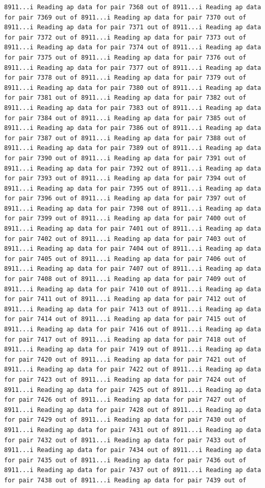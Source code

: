 \documentclass[
]{article}
\begin{document}
\begin{verbatim}
8911...i Reading ap data for pair 7368 out of 8911...i Reading ap data for pair 7369 out of 8911...i Reading ap data for pair 7370 out of 8911...i Reading ap data for pair 7371 out of 8911...i Reading ap data for pair 7372 out of 8911...i Reading ap data for pair 7373 out of 8911...i Reading ap data for pair 7374 out of 8911...i Reading ap data for pair 7375 out of 8911...i Reading ap data for pair 7376 out of 8911...i Reading ap data for pair 7377 out of 8911...i Reading ap data for pair 7378 out of 8911...i Reading ap data for pair 7379 out of 8911...i Reading ap data for pair 7380 out of 8911...i Reading ap data for pair 7381 out of 8911...i Reading ap data for pair 7382 out of 8911...i Reading ap data for pair 7383 out of 8911...i Reading ap data for pair 7384 out of 8911...i Reading ap data for pair 7385 out of 8911...i Reading ap data for pair 7386 out of 8911...i Reading ap data for pair 7387 out of 8911...i Reading ap data for pair 7388 out of 8911...i Reading ap data for pair 7389 out of 8911...i Reading ap data for pair 7390 out of 8911...i Reading ap data for pair 7391 out of 8911...i Reading ap data for pair 7392 out of 8911...i Reading ap data for pair 7393 out of 8911...i Reading ap data for pair 7394 out of 8911...i Reading ap data for pair 7395 out of 8911...i Reading ap data for pair 7396 out of 8911...i Reading ap data for pair 7397 out of 8911...i Reading ap data for pair 7398 out of 8911...i Reading ap data for pair 7399 out of 8911...i Reading ap data for pair 7400 out of 8911...i Reading ap data for pair 7401 out of 8911...i Reading ap data for pair 7402 out of 8911...i Reading ap data for pair 7403 out of 8911...i Reading ap data for pair 7404 out of 8911...i Reading ap data for pair 7405 out of 8911...i Reading ap data for pair 7406 out of 8911...i Reading ap data for pair 7407 out of 8911...i Reading ap data for pair 7408 out of 8911...i Reading ap data for pair 7409 out of 8911...i Reading ap data for pair 7410 out of 8911...i Reading ap data for pair 7411 out of 8911...i Reading ap data for pair 7412 out of 8911...i Reading ap data for pair 7413 out of 8911...i Reading ap data for pair 7414 out of 8911...i Reading ap data for pair 7415 out of 8911...i Reading ap data for pair 7416 out of 8911...i Reading ap data for pair 7417 out of 8911...i Reading ap data for pair 7418 out of 8911...i Reading ap data for pair 7419 out of 8911...i Reading ap data for pair 7420 out of 8911...i Reading ap data for pair 7421 out of 8911...i Reading ap data for pair 7422 out of 8911...i Reading ap data for pair 7423 out of 8911...i Reading ap data for pair 7424 out of 8911...i Reading ap data for pair 7425 out of 8911...i Reading ap data for pair 7426 out of 8911...i Reading ap data for pair 7427 out of 8911...i Reading ap data for pair 7428 out of 8911...i Reading ap data for pair 7429 out of 8911...i Reading ap data for pair 7430 out of 8911...i Reading ap data for pair 7431 out of 8911...i Reading ap data for pair 7432 out of 8911...i Reading ap data for pair 7433 out of 8911...i Reading ap data for pair 7434 out of 8911...i Reading ap data for pair 7435 out of 8911...i Reading ap data for pair 7436 out of 8911...i Reading ap data for pair 7437 out of 8911...i Reading ap data for pair 7438 out of 8911...i Reading ap data for pair 7439 out of 
\end{verbatim}
\end{document}
